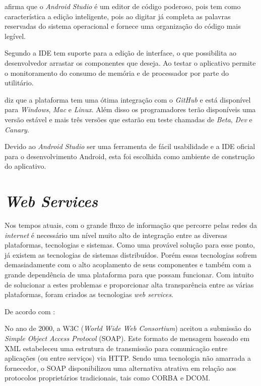 	\par {} afirma que o \textit{Android Studio} é um editor
de código poderoso, pois tem como característica a edição inteligente, pois ao
digitar já completa as palavras reservadas do sistema operacional e fornece uma
organização do código mais legível.

	\par Segundo  a IDE tem suporte para a edição de
interface, o que possibilita ao desenvolvedor arrastar os componentes que
deseja. Ao testar o aplicativo permite o monitoramento do consumo de memória e
de processador por parte do utilitário.

	\par {} diz que a plataforma tem uma ótima integração com
o \textit{GitHub} e está disponível para \textit{Windows}, \textit{Mac} e
\textit{Linux}. Além disso os programadores terão disponíveis uma versão
estável e mais três versões que estarão em teste chamadas de \textit{Beta},
\textit{Dev} e \textit{Canary}.

	\par Devido ao \textit{Android Studio} ser uma ferramenta de fácil usabilidade
e a IDE oficial para o desenvolvimento Android, esta foi escolhida como ambiente de
construção do aplicativo.	
	
\section{\textit{Web Services}}
	
	\par Nos tempos atuais, com o grande fluxo de informação que percorre pelas
redes da \textit{internet} é necessário um nível muito alto de integração entre
as diversas plataformas, tecnologias e sistemas. Como uma provável solução para
esse ponto, já existem as tecnologias de sistemas distribuídos. Porém essas
tecnologias sofrem demasiadamente com o alto acoplamento de seus componentes e
também com a grande dependência de uma plataforma para que possam funcionar. Com
intuito de solucionar a estes problemas e proporcionar alta transparência entre
as várias plataformas, foram criados as tecnologias \textit{web services}.
	
	\par De acordo com :
	\begin{citacao}
		No ano de 2000, a W3C (\textit{World Wide Web Consortium}) aceitou a submissão
		do \textit{Simple Object Access Protocol} (SOAP). Este formato de mensagem
		baseado em XML estabeleceu uma estrutura de transmissão para comunicação entre
		aplicações (ou entre serviços) via HTTP. Sendo uma tecnologia não amarrada a
		fornecedor, o SOAP disponibilizou uma alternativa atrativa em relação aos
		protocolos proprietários tradicionais, tais como CORBA e DCOM.
	\end{citacao}
	
